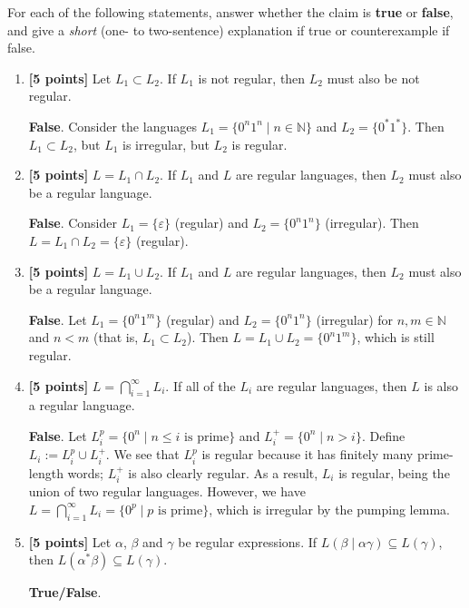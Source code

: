 \documentclass[11pt]{article}
\begin{document}
For each of the following statements, answer whether the claim is {\bf true}
or {\bf false}, and give a {\em short} (one- to two-sentence) explanation if true or counterexample if false.

\begin{enumerate}

\item {\bf [5 points]} Let $L_1 \subset L_2$.  If $L_1$ is not regular, then $L_2$ must also be not regular.

{\bf False}. Consider the languages $L_1 = \{0^n1^n \mid n \in \mathbb N\}$ and $L_2 = \{0^*1^*\}$. Then $L_1 \subset L_2$, but $L_1$ is irregular, but $L_2$ is regular.

\item {\bf [5 points]} $L = L_1 \cap L_2$.  If $L_1$ and $L$ are regular languages, then $L_2$ must also be a regular language.


{\bf False}. Consider $L_1 = \{\varepsilon\}$ (regular) and $L_2 = \{0^n1^n\}$ (irregular). Then $L = L_1 \cap L_2 = \{\varepsilon\}$ (regular).


\item {\bf [5 points]} $L = L_1 \cup L_2$.  If $L_1$ and $L$ are regular languages, then $L_2$ must also be a regular language.


{\bf False}. Let $L_1 = \{0^n1^m\}$ (regular) and $L_2 = \{0^n1^n\}$ (irregular) for $n,m \in \mathbb N$ and $n<m$ (that is, $L_1 \subset L_2$). Then $L = L_1 \cup L_2 = \{0^n1^m\}$, which is still regular.


\item {\bf [5 points]} $L = \bigcap_{i=1}^{\infty} L_i$.  If all of the $L_i$
are regular languages, then $L$ is also a regular language.


{\bf False}. Let $L_i^p = \{0^n \mid n \leq i \text{ is prime}\}$ and $L_i^+ = \{0^n \mid n > i\}$. Define $L_i := L_i^p \cup L_i^+$. We see that $L_i^p$ is regular because it has finitely many prime-length words; $L_i^+$ is also clearly regular. As a result, $L_i$ is regular, being the union of two regular languages. However, we have $L = \bigcap_{i=1}^\infty L_i = \{0^p \mid p \text{ is prime}\}$, which is irregular by the pumping lemma.

\item  {\bf [5 points]}  Let $\alpha$, $\beta$ and $\gamma$ be regular expressions. If $L(\beta \mid \alpha \gamma) \subseteq L(\gamma)$, then $L(\alpha^* \beta) \subseteq L(\gamma)$.


{\bf True/False}.


\end{enumerate}
\end{document}
